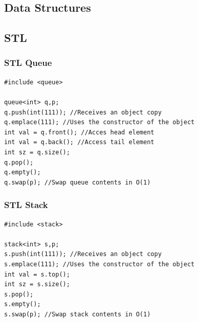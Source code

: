 \documentclass[twoside]{article}
\begin{document}
\selectfont
    \color{coolgray}
        \begin{multicols*}{2}
\tableofcontents
\newpage
{}
\sectionfont{\bfseries\sffamily\centering\Huge}
\vspace{1em}
\section*{Data Structures}
\vspace{3em}
\subsectionfont{\bfseries\sffamily\centering\LARGE}
\vspace{0em}
\subsection*{STL}
\vspace{2em}
\subsubsectionfont{\large\bfseries\sffamily\underline}
\subsubsection*{STL Queue}
\begin{verbatim}
#include <queue>

queue<int> q,p;
q.push(int(111)); //Receives an object copy
q.emplace(111); //Uses the constructor of the object
int val = q.front(); //Acces head element
int val = q.back(); //Access tail element
int sz = q.size();
q.pop();
q.empty();
q.swap(p); //Swap queue contents in O(1)

\end{verbatim}

\subsubsectionfont{\large\bfseries\sffamily\underline}
\subsubsection*{STL Stack}
\begin{verbatim}
#include <stack>

stack<int> s,p;
s.push(int(111)); //Receives an object copy
s.emplace(111); //Uses the constructor of the object
int val = s.top();
int sz = s.size();
s.pop();
s.empty();
s.swap(p); //Swap stack contents in O(1)

\end{verbatim}

\subsubsectionfont{\large\bfseries\sffamily\underline}

\end{multicols*}
\end{document}
